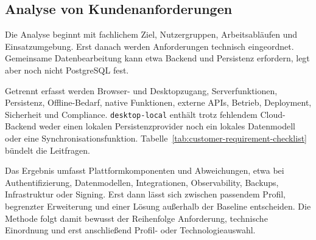 \subsection{Analyse von Kundenanforderungen}
\label{subsec:analyse-kundenanforderungen}

Die Analyse beginnt mit fachlichem Ziel, Nutzergruppen, Arbeitsabläufen und
Einsatzumgebung. Erst danach werden Anforderungen technisch eingeordnet.
Gemeinsame Datenbearbeitung kann etwa Backend und Persistenz erfordern, legt
aber noch nicht PostgreSQL fest.

Getrennt erfasst werden Browser- und Desktopzugang, Serverfunktionen,
Persistenz, Offline-Bedarf, native Funktionen, externe APIs, Betrieb,
Deployment, Sicherheit und Compliance. \texttt{desktop-local} enthält trotz
fehlendem Cloud-Backend weder einen lokalen Persistenzprovider noch ein lokales
Datenmodell oder eine Synchronisationsfunktion.
Tabelle~\ref{tab:customer-requirement-checklist} bündelt die Leitfragen.



Das Ergebnis umfasst Plattformkomponenten und Abweichungen, etwa bei
Authentifizierung, Datenmodellen, Integrationen, Observability, Backups,
Infrastruktur oder Signing. Erst dann lässt sich zwischen passendem Profil,
begrenzter Erweiterung und einer Lösung außerhalb der Baseline entscheiden.
Die Methode folgt damit bewusst der Reihenfolge Anforderung, technische
Einordnung und erst anschließend Profil- oder Technologieauswahl.
